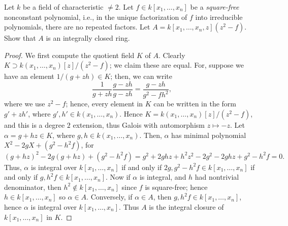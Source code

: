 \documentclass[10pt]{article}
\theoremstyle{definition}
\theoremstyle{remark}
\numberwithin{equation}{section}
\numberwithin{figure}{subsubsection}
\begin{document}
\begin{problem}
  Let $k$ be a field of characteristic $\ne 2$. Let $f \in k[x_1,\ldots,x_n]$ be a \emph{square-free} nonconstant polynomial, i.e., in the unique factorization of $f$ into irreducible polynomials, there are no repeated factors. Let $A = k[x_1,\ldots,x_n,z](z^2-f)$. Show that $A$ is an integrally closed ring.
\end{problem}
\begin{proof}
  We first compute the quotient field $K$ of $A$. Clearly $K \supset k(x_1,\ldots,x_n)[z]/(z^2-f)$; we claim these are equal. For, suppose we have an element $1/(g+zh) \in K$; then, we can write
  \begin{equation*}
    \frac{1}{g+zh}\frac{g-zh}{g-zh} = \frac{g-zh}{g^2-fh^2},
  \end{equation*}
  where we use $z^2 - f$; hence, every element in $K$ can be written in the form $g' + zh'$, where $g',h' \in k(x_1,\ldots,x_n)$. Hence $K = k(x_1,\ldots,x_n)[z]/(z^2-f)$, and this is a degree $2$ extension, thus Galois with automorphism $z \mapsto -z$. Let $\alpha = g + hz \in K$, where $g,h \in k(x_1,\ldots,x_n)$. Then, $\alpha$ has minimal polynomial $X^2 - 2gX + (g^2-h^2f)$, for
  \begin{equation*}
    (g+hz)^2 - 2g(g+hz) + (g^2 - h^2f) = g^2 + 2ghz + h^2z^2 - 2g^2 - 2ghz + g^2 - h^2f = 0.
  \end{equation*}
  Thus, $\alpha$ is integral over $k[x_1,\ldots,x_n]$ if and only if $2g,g^2-h^2f \in k[x_1,\ldots,x_n]$ if and only if $g, h^2f \in k[x_1,\ldots,x_n]$. Now if $\alpha$ is integral, and $h$ had nontrivial denominator, then $h^2 \notin k[x_1,\ldots,x_n]$ since $f$ is square-free; hence $h \in k[x_1,\ldots,x_n]$ so $\alpha \in A$. Conversely, if $\alpha \in A$, then $g,h^2f \in k[x_1,\ldots,x_n]$, hence $\alpha$ is integral over $k[x_1,\ldots,x_n]$. Thus $A$ is the integral closure of $k[x_1,\ldots,x_n]$ in $K$.
\end{proof}
\end{document}
